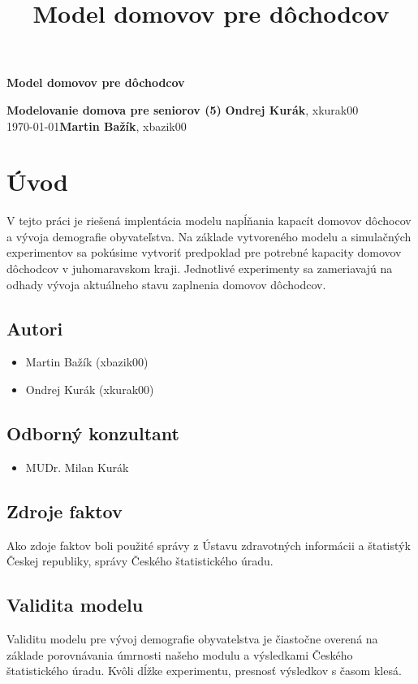 \documentclass[a4paper, 11pt]{article}
\title{Model domovov pre dôchodcov}
\begin{document}
\begin{center}
\Large \textbf{Model domovov pre dôchodcov}
\end{center}
\noindent
\large\textbf{Modelovanie domova pre seniorov (5)} \hfill \textbf{Ondrej Kurák}, xkurak00 \\
\today \hfill \textbf{Martin Bažík}, xbazik00 \\


\section{Úvod}
V tejto práci je riešená implentácia modelu\cite[str. 7]{IMS} napĺňania kapacít domovov dôchocov a vývoja demografie obyvateľstva. Na základe vytvoreného modelu a simulačných experimentov\cite[str. 8]{IMS} sa pokúsime vytvoriť predpoklad pre potrebné kapacity domovov dôchodcov v juhomaravskom kraji. Jednotlivé experimenty sa zameriavajú na odhady vývoja aktuálneho stavu zaplnenia domovov dôchodcov.
\subsection{Autori}
\begin{itemize}
\item Martin Bažík (xbazik00)
\item Ondrej Kurák (xkurak00)
\end{itemize}
\subsection{Odborný konzultant}
\begin{itemize}
\item MUDr. Milan Kurák
\end{itemize}
\subsection{Zdroje faktov}
Ako zdoje faktov boli použité správy z Ústavu zdravotných informácii a štatistýk Českej republiky\cite{demografia}\cite{domovy}, správy Českého štatistického úradu\cite{zomreli}. 
\subsection{Validita modelu}
Validitu modelu\cite[str. 37]{IMS} pre vývoj demografie obyvatelstva je čiastočne overená na základe porovnávania úmrnosti našeho modulu a výsledkami Českého štatistického úradu\cite{lifet}. Kvôli dĺžke experimentu, presnosť výsledkov s časom klesá.
\end{document}
